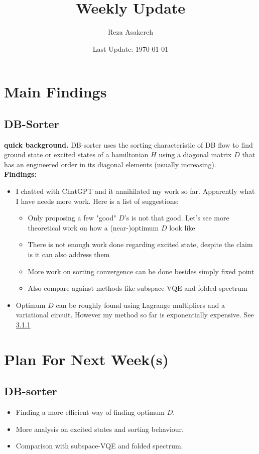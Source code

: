 \documentclass[11pt]{article}
\title{Weekly Update}
\author{Reza Asakereh}
\date{Last Update: \today}
\begin{document}
\maketitle

\section{Main Findings}
\subsection{DB-Sorter}
\textbf{quick background.} DB-sorter uses the sorting characteristic of DB flow to find ground state or excited states of a hamiltonian $H$ using a diagonal matrix $D$ that has an engineered order in its diagonal elements (usually increasing). 
\\

\textbf{Findings:}
\begin{itemize}
    \item I chatted with ChatGPT and it annihilated my work so far. Apparently what I have needs more work. Here is a list of suggestions:
    \begin{itemize}
        \item Only proposing a few "good" $D$'s is not that good. Let's see more theoretical work on how a (near-)optimum $D$ look like
        \item There is not enough work done regarding excited state, despite the claim is it can also address them
        \item More work on sorting convergence can be done besides simply fixed point
        \item Also compare against methods like subspace-VQE and folded spectrum
    \end{itemize}
    \item Optimum $D$ can be roughly found using Lagrange multipliers and a variational circuit. However my method so far is exponentially expensive. See \hyperref[sec:optimum-D]{3.1.1}
\end{itemize}


\section{Plan For Next Week(s)}
\subsection{DB-sorter}
\begin{itemize}
    \item Finding a more efficient way of finding optimum $D$.
    \item More analysis on excited states and sorting behaviour.
    \item Comparison with subspace-VQE and folded spectrum.
\end{itemize}
\end{document}
